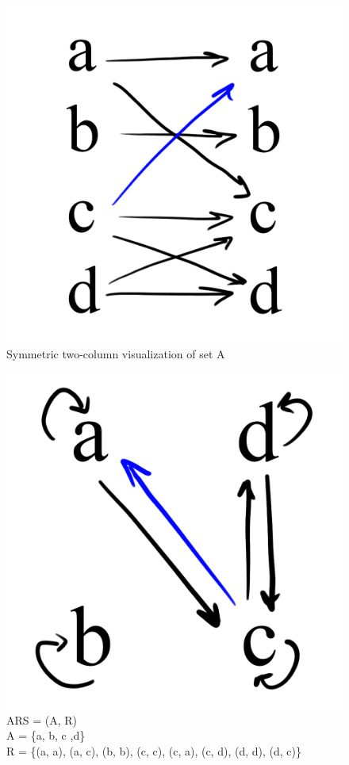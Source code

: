 \documentclass{article}
\begin{document}
{\begin{figure}[h!]
  \centering
  \includegraphics[scale=0.06]{s3}
  \caption[] {
     Symmetric two-column visualization of set A
    \endtabular}
\end{figure}

\begin{figure}[h!]
  \centering
  \includegraphics[scale=0.06]{v2}
  \caption[] {
     ARS = (A, R) \\ A = \{a, b, c ,d\} \\ R = \{(a, a), (a, c), (b, b), (c, c), (c, a), (c, d), (d, d), (d, c)\}
    \endtabular}
\end{figure}
    
}
\end{document}
